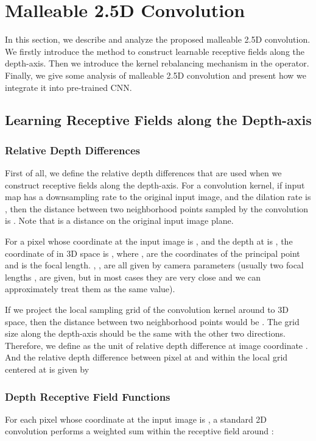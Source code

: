 \documentclass[runningheads]{llncs}
\begin{document}
\section{Malleable 2.5D Convolution}
In this section, we describe and analyze the proposed malleable 2.5D convolution.
We firstly introduce the method to construct learnable receptive fields along the depth-axis.
Then we introduce the kernel rebalancing mechanism in the operator.
Finally, we give some analysis of malleable 2.5D convolution and present how we integrate it into pre-trained CNN.

\subsection{Learning Receptive Fields along the Depth-axis}
\subsubsection{Relative Depth Differences}
First of all, we define the relative depth differences that are used when we construct receptive fields along the depth-axis.
For a convolution kernel, if input map has a downsampling rate  to the original input image, and the dilation rate is , then the distance between two neighborhood points sampled by the convolution is .
Note that  is a distance on the original input image plane.

For a pixel  whose coordinate at the input image is , and the depth at  is ,
the coordinate of  in 3D space is ,
where ,  are the coordinates of the principal point and  is the focal length.
, ,  are all given by camera parameters (usually two focal lengths ,  are given, but in most cases they are very close and we can approximately treat them as the same value).

If we project the local sampling grid of the convolution kernel around  to 3D space, then the distance between two neighborhood points would be .
The grid size along the depth-axis should be the same with the other two directions.
Therefore, we define  as the unit of relative depth difference at image coordinate .
And the relative depth difference between pixel at  and  within the local grid centered at  is given by


\subsubsection{Depth Receptive Field Functions}
For each pixel  whose coordinate at the input image is , a standard 2D convolution performs a weighted sum within the receptive field around :
\end{document}
